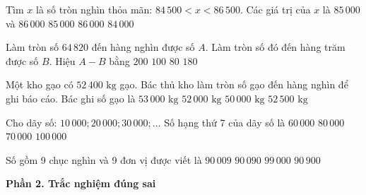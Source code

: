\begin{ex} %
Tìm $x$ là số tròn nghìn thỏa mãn: $84\,500 < x < 86\,500$. Các giá trị của $x$ là
\choice
{\True $85\,000$ và $86\,000$}
{$85\,000$}
{$86\,000$}
{$84\,000$}
\end{ex}

\begin{ex} %
Làm tròn số $64\,820$ đến hàng nghìn được số $A$. Làm tròn số đó đến hàng trăm được số $B$. Hiệu $A - B$ bằng
\choice
{$200$}
{$100$}
{$80$}
{\True $180$}
\end{ex}

\begin{ex} %
Một kho gạo có $52\,400\text{ kg}$ gạo. Bác thủ kho làm tròn số gạo đến hàng nghìn để ghi báo cáo. Bác ghi số gạo là
\choice
{$53\,000\text{ kg}$}
{\True $52\,000\text{ kg}$}
{$50\,000\text{ kg}$}
{$52\,500\text{ kg}$}
\end{ex}

\begin{ex} %
Cho dãy số: $10\,000; 20\,000; 30\,000; \dots$ Số hạng thứ 7 của dãy số là
\choice
{$60\,000$}
{$80\,000$}
{\True $70\,000$}
{$100\,000$}
\end{ex}

\begin{ex} %
Số gồm 9 chục nghìn và 9 đơn vị được viết là
\choice
{\True $90\,009$}
{$90\,090$}
{$99\,000$}
{$90\,900$}
\end{ex}

\textbf{Phần 2. Trắc nghiệm đúng sai}

